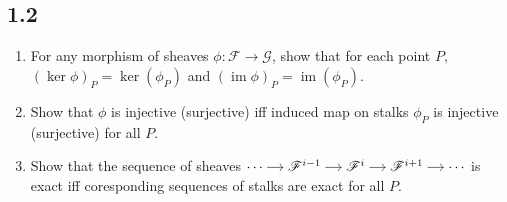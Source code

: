 \subsection*{1.2}
\begin{enumerate}
    \item For any morphism of sheaves $\phi: \mathscr{F}\to\mathscr{G}$, show that for each point $P$, $(\ker \phi )_{P}=\ker(\phi_{P})$ and $(\operatorname{im}\phi)_{P} = \operatorname{im}(\phi_{P})$.
    \item Show that $\phi$ is injective (surjective) iff induced map on stalks $\phi_{P}$ is injective (surjective) for all $P$.
    \item Show that the sequence of sheaves $\begin{tikzcd}[cramped, sep=small] \cdots \arrow[r] & \mathscr{F}^{i-1} \arrow[r] & \mathscr{F}^{i} \arrow[r] & \mathscr{F}^{i+1} \arrow[r] & \cdots \end{tikzcd}$ is exact iff coresponding sequences of stalks are exact for all $P$.

\end{enumerate}